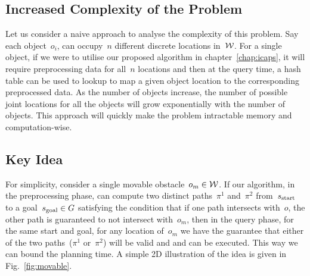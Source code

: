 \documentclass[a4paper]{report}
\begin{document}
\subsection{Increased Complexity of the Problem}
Let us consider a naive approach to analyse the complexity of this problem. Say each object~$o_i$, can occupy~$n$ different discrete locations in~$\mathcal{W}$. For a single object, if we were to utilise our proposed algorithm in chapter~\ref{chap:icaps}, it will require preprocessing data for all~$n$ locations and then at the query time, a hash table can be used to lookup to map a given object location to the corresponding preprocessed data. As the number of objects increase, the number of possible joint locations for all the objects will grow exponentially with the number of objects. This approach will quickly make the problem intractable memory and computation-wise.

\subsection{Key Idea}
For simplicity, consider a single movable obstacle~$o_m \in \mathcal{W}$. If our algorithm, in the preprocessing phase, can compute two distinct paths~$\pi^1$ and~$\pi^2$ from~$s_{\text{start}}$ to a goal~$s_{\text{goal}} \in G$ satisfying the condition that if one path intersects with~$o$, the other path is guaranteed to not intersect with~$o_m$, then in the query phase, for the same start and goal, for any location of~$o_m$ we have the guarantee that either of the two paths~($\pi^1$ or~$\pi^2$) will be valid and and can be executed. This way we can bound the planning time. A simple 2D illustration of the idea is given in Fig.~\ref{fig:movable}.
\end{document}
